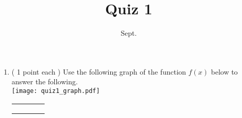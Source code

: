 \documentclass{quiz}
\title{Quiz 1}
\date{Sept.}
\newcommand{\ds}{\displaystyle}
\begin{document}
\maketitle
\begin{enumerate}
\item ( 1 point each ) Use the following graph of the function $f(x)$ below to answer the following.\\
\texttt{[image: quiz1\_graph.pdf]}\\[.25in]
\begin{inparaenum}
\begin{tabular}{llll}
\item $\ds \lim_{x \to -5^+}f(x)=$\underline{\hspace{.5in}}&
\item $\ds \lim_{x \to -5^-}f(x)=$\underline{\hspace{.5in}}&
\item $\ds \lim_{x \to -5}f(x)=$\underline{\hspace{.5in}}&
\item $f(-5)=$\underline{\hspace{.5in}}\\[.2in]
\item $\ds \lim_{x \to 0^+}f(x)=$\underline{\hspace{.5in}}&
\item $\ds \lim_{x \to 0^-}f(x)=$\underline{\hspace{.5in}}&
\item $\ds \lim_{x \to 0}f(x)=$\underline{\hspace{.5in}}&
\item $f(0)=$\underline{\hspace{.5in}}\\[.2in]
\item $\ds \lim_{x \to 5^+}f(x)=$\underline{\hspace{.5in}}&
\item $\ds \lim_{x \to 5^-}f(x)=$\underline{\hspace{.5in}}&

\end{tabular}
\end{inparaenum}
\end{enumerate}
\end{document}
